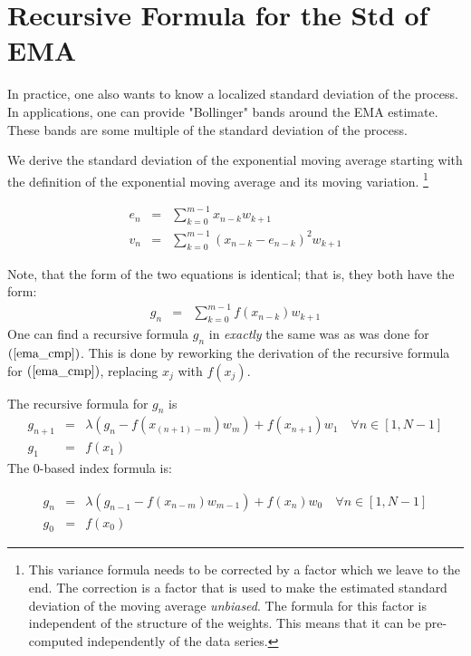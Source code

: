 \documentclass{article}
\begin{document}
\section{Recursive Formula for the Std of EMA}
In practice, one also wants to know a localized standard deviation of the process.
In applications, one can provide "Bollinger" bands around the EMA estimate.
These bands are some multiple of the standard deviation of the process.

We derive the standard deviation of the exponential moving average starting
with the definition of the exponential moving average and its moving variation.%
\footnote{This variance formula needs to be corrected by a factor which we 
leave to the end. The correction is a factor that is used to make the 
estimated standard deviation of the moving average {\em unbiased\/}.
The formula for this factor is independent of the structure of the weights.
This means that it can be pre-computed independently of the data series.}

\begin{eqnarray}
    e_n &=&  \sum_{k=0}^{m-1} x_{n-k} w_{k+1} \label{ema_cmp} \\
    v_n &=&  \sum_{k=0}^{m-1} (x_{n-k} - e_{n-k})^2 w_{k+1}  \label{var} 
\end{eqnarray}

Note, that the form of the two equations is identical; that is, 
they both have the form:
\begin{eqnarray}
    g_n &=& \sum_{k=0}^{m-1} f(x_{n-k}) w_{k+1} 
\end{eqnarray}
One can find a recursive formula $g_n$ in {\em exactly\/} the same was as
was done for $(\ref{ema_cmp})$. This is done by reworking the derivation of 
the recursive formula for $(\ref{ema_cmp})$, replacing $x_j$ with $f(x_j)$.

The recursive formula for $g_n$ is
\begin{eqnarray}
    g_{n+1} &=&  \lambda \left( g_{n} - f(x_{(n+1)-m}) w_m \right) + f(x_{n+1}) w_1  \quad \forall n \in [1, N-1] \\
    g_1     &=&  f(x_1) 
\end{eqnarray}
The 0-based index formula is:

\begin{eqnarray}
    g_{n} &=&  \lambda \left( g_{n-1} - f(x_{n-m}) w_{m-1} \right) + f(x_{n}) w_0  \quad \forall n \in [1, N-1] \\
    g_0   &=&  f(x_0) 
\end{eqnarray}
\end{document}
